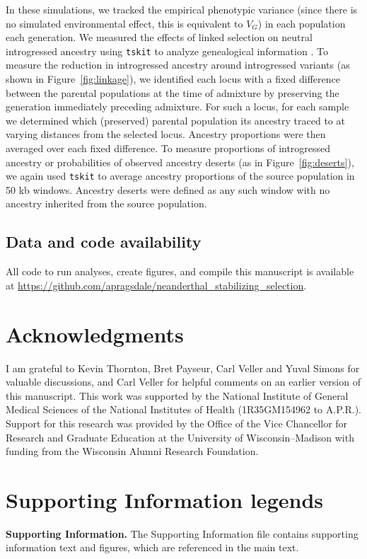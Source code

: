 \documentclass{article}
\newcommand{\tskit}{\texttt{tskit}\xspace}
\begin{document}
In these simulations, we tracked the empirical phenotypic variance (since there
is no simulated environmental effect, this is equivalent to $V_G$) in each
population each generation. We measured the effects of linked selection on
neutral introgressed ancestry using \tskit to analyze genealogical
information \citep{ralph2020efficiently}. To measure the reduction in
introgressed ancestry around introgressed variants (as shown in
Figure~\ref{fig:linkage}), we identified each locus with a fixed difference
between the parental populations at the time of admixture by preserving the
generation immediately preceding admixture. For such a locus, for each sample
we determined which (preserved) parental population its ancestry traced to at
varying distances from the selected locus. Ancestry proportions were then
averaged over each fixed difference. To measure proportions of introgressed
ancestry or probabilities of observed ancestry deserts (as in
Figure~\ref{fig:deserts}), we again used \tskit to average ancestry proportions
of the source population in 50 kb windows. Ancestry deserts were defined as
any such window with no ancestry inherited from the source population.

\subsection*{Data and code availability}

All code to run analyses, create figures, and compile this manuscript is
available at
\url{https://github.com/apragsdale/neanderthal_stabilizing_selection}.


\section*{Acknowledgments}

I am grateful to Kevin Thornton, Bret Payseur, Carl Veller and Yuval Simons for
valuable discussions, and Carl Veller for helpful comments on an earlier
version of this manuscript. This work was supported by the National Institute
of General Medical Sciences of the National Institutes of Health (1R35GM154962
to A.P.R.). Support for this research was provided by the Office of the Vice
Chancellor for Research and Graduate Education at the University of
Wisconsin–Madison with funding from the Wisconsin Alumni Research Foundation.




\section*{Supporting Information legends}

\textbf{Supporting Information.} The Supporting Information file contains
supporting information text and figures, which are referenced in the main text.
\end{document}
